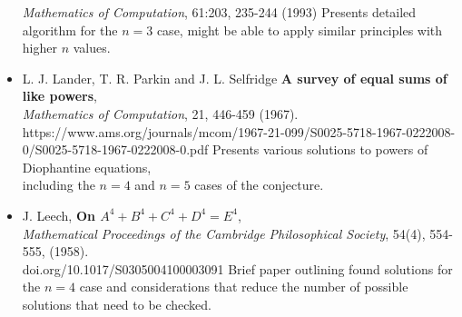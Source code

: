 \documentclass{article}
\begin{document}
\begin{itemize}
        \textit{Mathematics of Computation}, 61:203, 235-244 (1993)
        \subitem Presents detailed algorithm for the $n=3$ case, might be able to apply similar principles with higher $n$ values. \\
    \item L. J. Lander, T. R. Parkin and J. L. Selfridge
       {\bf A survey of equal sums of like powers}, \\
        \textit{Mathematics of Computation}, 21, 446-459 (1967). \\
        https://www.ams.org/journals/mcom/1967-21-099/S0025-5718-1967-0222008-0/S0025-5718-1967-0222008-0.pdf 
        \subitem Presents various solutions to powers of Diophantine equations, \\
        including the $n=4$ and $n=5$ cases of the conjecture. 
    \item J. Leech, {\bf On $A^4 + B^4 + C^4 + D^4 = E^4$}, \\ 
        \textit{Mathematical Proceedings of the Cambridge Philosophical Society}, 54(4), 554-555, (1958). \\
        doi.org/10.1017/S0305004100003091
        \subitem Brief paper outlining found solutions for the $n=4$ case and considerations that reduce the number of possible solutions that need to be checked. 
\end{itemize}
\end{document}
